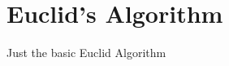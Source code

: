 \documentclass{article}
\begin{document}
    
    \tableofcontents

    \section{Euclid's Algorithm}

    Just the basic Euclid Algorithm
\end{document}
